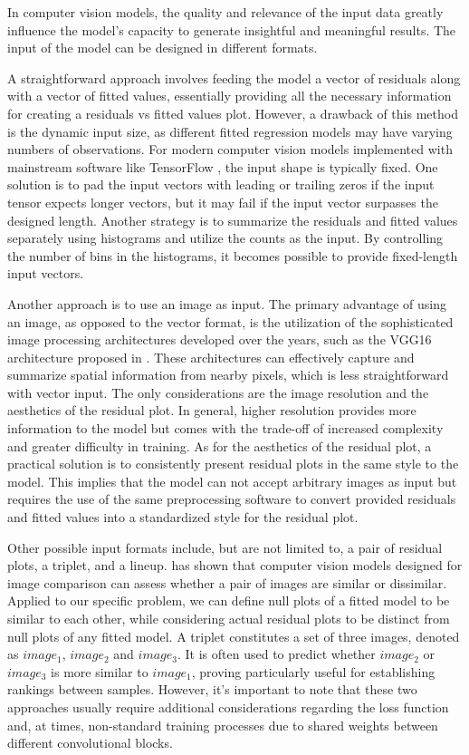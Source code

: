 \documentclass[]{interact}
\theoremstyle{plain}%
\theoremstyle{definition}
\theoremstyle{remark}
\begin{document}
In computer vision models, the quality and relevance of the input data
greatly influence the model's capacity to generate insightful and
meaningful results. The input of the model can be designed in different
formats.

A straightforward approach involves feeding the model a vector of
residuals along with a vector of fitted values, essentially providing
all the necessary information for creating a residuals vs fitted values
plot. However, a drawback of this method is the dynamic input size, as
different fitted regression models may have varying numbers of
observations. For modern computer vision models implemented with
mainstream software like TensorFlow \citep{abadi2016tensorflow}, the
input shape is typically fixed. One solution is to pad the input vectors
with leading or trailing zeros if the input tensor expects longer
vectors, but it may fail if the input vector surpasses the designed
length. Another strategy is to summarize the residuals and fitted values
separately using histograms and utilize the counts as the input. By
controlling the number of bins in the histograms, it becomes possible to
provide fixed-length input vectors.

Another approach is to use an image as input. The primary advantage of
using an image, as opposed to the vector format, is the utilization of
the sophisticated image processing architectures developed over the
years, such as the VGG16 architecture proposed in
\citet{simonyan2014very}. These architectures can effectively capture
and summarize spatial information from nearby pixels, which is less
straightforward with vector input. The only considerations are the image
resolution and the aesthetics of the residual plot. In general, higher
resolution provides more information to the model but comes with the
trade-off of increased complexity and greater difficulty in training. As
for the aesthetics of the residual plot, a practical solution is to
consistently present residual plots in the same style to the model. This
implies that the model can not accept arbitrary images as input but
requires the use of the same preprocessing software to convert provided
residuals and fitted values into a standardized style for the residual
plot.

Other possible input formats include, but are not limited to, a pair of
residual plots, a triplet, and a lineup. \citet{chopra2005learning} has
shown that computer vision models designed for image comparison can
assess whether a pair of images are similar or dissimilar. Applied to
our specific problem, we can define null plots of a fitted model to be
similar to each other, while considering actual residual plots to be
distinct from null plots of any fitted model. A triplet constitutes a
set of three images, denoted as \(image_1\), \(image_2\) and
\(image_3\). It is often used to predict whether \(image_2\) or
\(image_3\) is more similar to \(image_1\), proving particularly useful
for establishing rankings between samples. However, it's important to
note that these two approaches usually require additional considerations
regarding the loss function and, at times, non-standard training
processes due to shared weights between different convolutional blocks.
\end{document}
